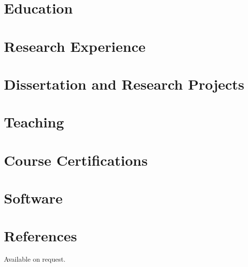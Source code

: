 \documentclass{prometheus_cv}
\begin{document}
\thispagestyle{empty}					%
\pagestyle{fancy}			 		%

\vspace*{-1cm}
\centering 

\section{Education}

\vspace{-0.8em}
\section{Research Experience}

\vspace{-0.8em}
\section{Dissertation and Research Projects}

\vspace{-0.8em}
\section{Teaching}

\vspace{-0.8em}

\section{Course Certifications}

\vspace{-0.8em}

\section{Software}

\vspace{-0.8em}
% 

\section{References}
Available on request.
\end{document}
